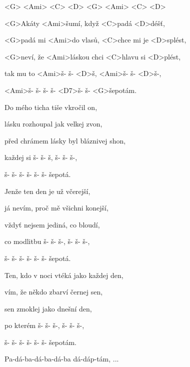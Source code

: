 

<G> <Ami> <C> <D> <G> <Ami> <C> <D>

\zs
<G>Akáty <Ami>šumí, když <C>padá <D>déšť,

<G>padá mi <Ami>do vlasů, <C>chce mi je <D>splést,

<G>neví, že <Ami>láskou chci <C>hlavu si <D>plést,

tak mu to <Ami>š- š- <D>š, <Ami>š- š- <D>š-,

<Ami>š- š- š- š- <D7>š- š- <G>šepotám.
\ks

\zs
Do mého ticha tiše vkročil on,

lásku rozhoupal jak velkej zvon,

před chrámem lásky byl bláznivej shon,

každej si š- š- š, š- š- š-,

š- š- š- š- š- š- šepotá.
\ks

\zs
Jenže ten den je už včerejší,

já nevím, proč mě všichni konejší,

vždyť nejsem jediná, co bloudí,

co modlitbu š- š- š-, š- š- š-,

š- š- š- š- š- š- šepotá.
\ks

\zs
Ten, kdo v noci vtéká jako každej den,

vím, že někdo zbarví černej sen,

sen zmoklej jako dnešní den,

po kterém š- š- š-, š- š- š-,

š- š- š- š- š- š- šepotám.
\ks

\zs
Pa-dá-ba-dá-ba-dá-ba dá-dáp-tám, ...
\ks

\kp





